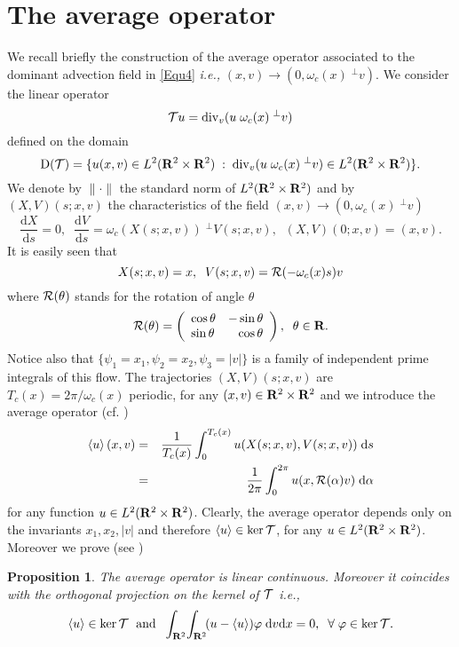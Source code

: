 \documentclass[12pt, a4paper]{article}
\providecommand\mathbb{\bf}
\newcommand\R{{\mathbb R}}
\newtheorem{pro}{Proposition}[section]
\newcommand{\intxv}[1]{
\int _{\R^2}\!\int _{\R^2} \!#1 \;\mathrm{d}v\mathrm{d}x}
\newcommand{\Divv}[0]{
\mathrm{div}_v}
\newcommand{\ltxv}[0]{
L^2(\R ^2 \times \R ^2)}
\newcommand{\oc}[0]{
\omega _c (x)}
\newcommand{\tc}[0]{
T_c (x)}
\newcommand{\ave}[1]{
\left \langle #1 \right \rangle }
\newcommand{\D}[0]{
\mathrm{D}}
\begin{document}
\section{The average operator}
\label{AveOpe}
We recall briefly the construction of the average operator associated to the dominant advection field in \eqref{Equ4} {\it i.e.,} $(x,v) \to (0, \oc \;^\perp v )$. We consider the linear operator
\[
{\cal T} u = \Divv ( u \;\oc \;^\perp v)
\]
defined on the domain
\[
\D ({\cal T}) = \{ u(x,v) \in \ltxv\;:\; \Divv ( u \;\oc \;^\perp v) \in \ltxv \}.
\]
We denote by $\|\cdot \|$ the standard norm of $\ltxv$ and by $(X,V)(s;x,v)$ the characteristics of the field $ (x,v) \to (0, \oc \;^\perp v )$
\begin{equation}
\label{Equ21} \frac{\mathrm{d}X}{\mathrm{d}s} = 0,\;\;\frac{\mathrm{d}V}{\mathrm{d}s} = \omega _c (X(s;x,v)) \;^\perp V(s;x,v),\;\;(X,V)(0;x,v) = (x,v).
\end{equation}
It is easily seen that 
\begin{equation}
\label{Equ22}
X(s;x,v) = x,\;\;V(s;x,v) = {\cal R}(- \oc s) v
\end{equation}
where ${\cal R} (\theta) $ stands for the rotation of angle $\theta$
\begin{equation}\nonumber
{\cal R}(\theta) = \left (
\begin{array}{lll}
\cos \theta  &  -\sin \theta\\
\sin \theta  &\;\;\;   \cos \theta
\end{array}
\right ),\;\;\theta \in \R.
\end{equation}
Notice also that $\{\psi _ 1 = x_1, \psi _2 = x_2, \psi _3 = |v|\}$ is a family of independent prime integrals of this flow. The trajectories $(X,V)(s;x,v)$ are $\tc = 2\pi /\oc $ periodic, for any $(x,v) \in \R^2 \times \R^2$ and we introduce the average operator (cf. \cite{BosTraSin})
\begin{eqnarray}
\ave{u} (x,v) & = & \frac{1}{\tc} \int _0 ^{\tc} u (X(s;x,v), V(s;x,v))\;\mathrm{d}s \nonumber \\
& = & \frac{1}{2\pi} \int _0 ^{2\pi} u (x, {\cal R}(\alpha) v) \;\mathrm{d}\alpha \nonumber 
\end{eqnarray}
for any function $u \in \ltxv{}$. Clearly, the average operator depends only on the invariants $x_1, x_2, |v|$ and therefore $\ave{u} \in \ker {\cal T}$, for any 
$u \in \ltxv{}$. Moreover we prove (see \cite{BosGuidCent3D})
\begin{pro}
\label{AverageProp} The average operator is linear continuous. Moreover it coincides with the orthogonal projection on the kernel of ${\cal T}$ {\it i.e.,}
$$
\ave{u} \in \ker {\cal T}\;\mbox{ and }\;\intxv{(u - \ave{u}) \varphi } = 0,\;\;\forall \; \varphi \in \ker {\cal T}.
$$
\end{pro}
\end{document}

